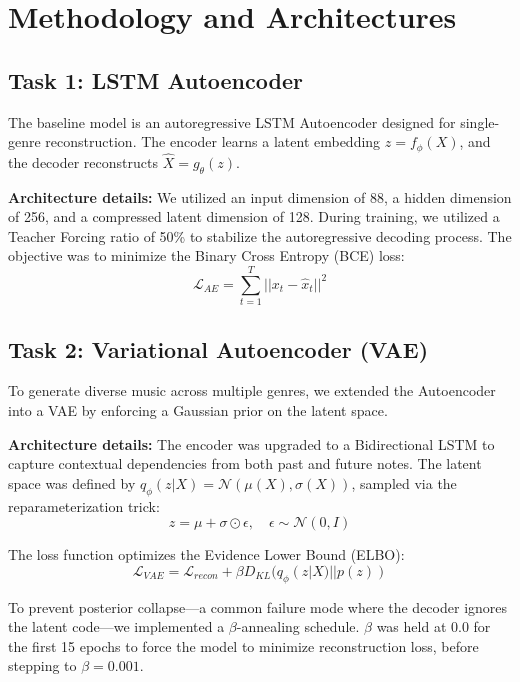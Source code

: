 \documentclass[conference]{IEEEtran}
\begin{document}
\section{Methodology and Architectures}

\subsection{Task 1: LSTM Autoencoder}
The baseline model is an autoregressive LSTM Autoencoder designed for single-genre reconstruction. The encoder learns a latent embedding $z=f_{\phi}(X)$, and the decoder reconstructs $\hat{X}=g_{\theta}(z)$. 

\textbf{Architecture details:} We utilized an input dimension of 88, a hidden dimension of 256, and a compressed latent dimension of 128. During training, we utilized a Teacher Forcing ratio of 50\% to stabilize the autoregressive decoding process. The objective was to minimize the Binary Cross Entropy (BCE) loss:
\begin{equation}
\mathcal{L}_{AE}=\sum_{t=1}^{T}||x_{t}-\hat{x}_{t}||^{2}
\end{equation}



\subsection{Task 2: Variational Autoencoder (VAE)}
To generate diverse music across multiple genres, we extended the Autoencoder into a VAE by enforcing a Gaussian prior on the latent space. 

\textbf{Architecture details:} The encoder was upgraded to a Bidirectional LSTM to capture contextual dependencies from both past and future notes. The latent space was defined by $q_{\phi}(z|X)=\mathcal{N}(\mu(X),\sigma(X))$, sampled via the reparameterization trick:
\begin{equation}
z=\mu+\sigma\odot\epsilon, \quad \epsilon \sim \mathcal{N}(0, I)
\end{equation}

The loss function optimizes the Evidence Lower Bound (ELBO):
\begin{equation}
\mathcal{L}_{VAE}=\mathcal{L}_{recon}+\beta D_{KL}(q_{\phi}(z|X)||p(z))
\end{equation}

To prevent posterior collapse---a common failure mode where the decoder ignores the latent code---we implemented a $\beta$-annealing schedule. $\beta$ was held at $0.0$ for the first 15 epochs to force the model to minimize reconstruction loss, before stepping to $\beta=0.001$.
\end{document}
